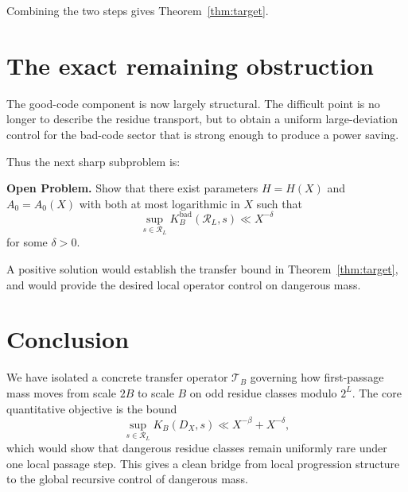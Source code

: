 \documentclass[11pt]{article}
\theoremstyle{definition}
\theoremstyle{remark}
\newcommand{\1}{\mathbf{1}}
\newcommand{\Res}{\mathcal R_L}
\newcommand{\DX}{D_X}
\newcommand{\KB}{K_B}
\newcommand{\TB}{\mathcal T_B}
\begin{document}
Combining the two steps gives Theorem~\ref{thm:target}.

\section{The exact remaining obstruction}

The good-code component is now largely structural. The difficult point is no longer to describe the residue transport, but to obtain a uniform large-deviation control for the bad-code sector that is strong enough to produce a power saving.

Thus the next sharp subproblem is:

\medskip
\noindent
\textbf{Open Problem.}
Show that there exist parameters $H=H(X)$ and $A_0=A_0(X)$ with both at most logarithmic in $X$ such that
\[
\sup_{s\in\Res}\KB^{\mathrm{bad}}(\Res,s)\ll X^{-\delta}
\]
for some $\delta>0$.
\medskip

A positive solution would establish the transfer bound in Theorem~\ref{thm:target}, and would provide the desired local operator control on dangerous mass.

\section{Conclusion}

We have isolated a concrete transfer operator $\TB$ governing how first-passage mass moves from scale $2B$ to scale $B$ on odd residue classes modulo $2^L$. The core quantitative objective is the bound
\[
\sup_{s\in\Res}\KB(\DX,s)\ll X^{-\beta}+X^{-\delta},
\]
which would show that dangerous residue classes remain uniformly rare under one local passage step. This gives a clean bridge from local progression structure to the global recursive control of dangerous mass.
\end{document}
